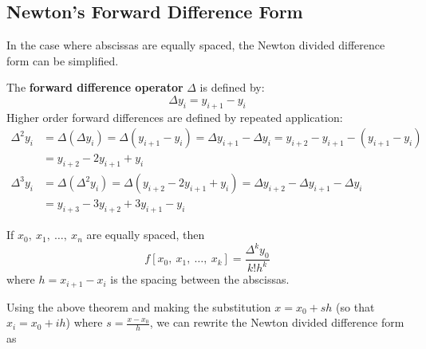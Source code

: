 \documentclass{article}
\begin{document}
\subsection{Newton's Forward Difference Form}
In the case where abscissas are equally spaced, the Newton divided difference form can be simplified.
\begin{definition}
    The \textbf{forward difference operator} \(\Delta\) is defined by:
    \begin{equation*}
        \Delta y_i = y_{i + 1} - y_i
    \end{equation*}
    Higher order forward differences are defined by repeated application:
    \begin{align*}
        \Delta^2 y_i & = \Delta \left( \Delta y_i \right) = \Delta \left( y_{i + 1} - y_i \right) = \Delta y_{i + 1} - \Delta y_i = y_{i + 2} - y_{i + 1} - \left( y_{i + 1} - y_i \right) \\
                     & = y_{i + 2} - 2y_{i + 1} + y_i                                                                                                                                      \\
        \Delta^3 y_i & = \Delta \left( \Delta^2 y_i \right) = \Delta \left( y_{i + 2} - 2y_{i + 1} + y_i \right) = \Delta y_{i + 2} - \Delta y_{i + 1} - \Delta y_i                        \\
                     & = y_{i + 3} - 3y_{i + 2} + 3y_{i + 1} - y_i
    \end{align*}
\end{definition}
\begin{theorem}
    If \(x_0,\: x_1,\: \dots,\: x_n\) are equally spaced, then
    \begin{equation*}
        f\left[ x_0,\: x_1,\: \dots,\: x_k \right] = \frac{\Delta^k y_0}{k! h^k}
    \end{equation*}
    where \(h = x_{i + 1} - x_i\) is the spacing between the abscissas.
\end{theorem}
Using the above theorem and making the substitution \(x = x_0 + sh\) (so that \(x_i = x_0 + ih\)) where \(s = \frac{x - x_0}{h}\), we can rewrite the Newton divided difference form as
\end{document}
